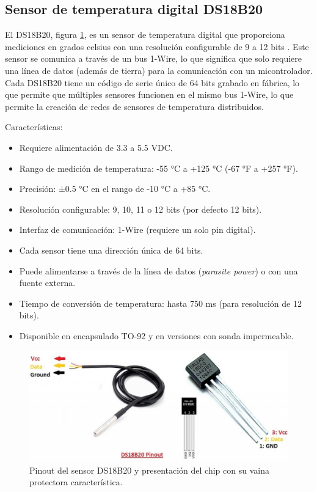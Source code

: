 \subsection{Sensor de temperatura digital DS18B20}

El DS18B20, figura \ref{fig:ds18b20}, es un sensor de temperatura digital que proporciona mediciones en grados celsius con una resolución configurable de 9 a 12 bits \cite{DS18B20}. Este sensor se comunica a través de un bus 1-Wire, lo que significa que solo requiere una línea de datos (además de tierra) para la comunicación con un micontrolador. Cada DS18B20 tiene un código de serie único de 64 bits grabado en fábrica, lo que permite que múltiples sensores funcionen en el mismo bus 1-Wire, lo que permite la creación de redes de sensores de temperatura distribuidos.

Características:

\begin{itemize}
	\item Requiere alimentación de 3.3 a 5.5 VDC.
	\item Rango de medición de temperatura: -55 °C a +125 °C (-67 °F a +257 °F).
	\item Precisión: ±0.5 °C en el rango de -10 °C a +85 °C.
	\item Resolución configurable: 9, 10, 11 o 12 bits (por defecto 12 bits).
	\item Interfaz de comunicación: 1-Wire (requiere un solo pin digital).
	\item Cada sensor tiene una dirección única de 64 bits.
	\item Puede alimentarse a través de la línea de datos (\textit{parasite power}) o con una fuente externa.
	\item Tiempo de conversión de temperatura: hasta 750 ms (para resolución de 12 bits).
	\item Disponible en encapsulado TO-92 y en versiones con sonda impermeable.
\end{itemize}


\begin{figure}[h]
\centering
\includegraphics[scale=.5]{./Figures/ds18b20.png}
	\caption{Pinout del sensor DS18B20 y presentación del chip con su vaina protectora característica\protect\footnotemark.}
	\label{fig:ds18b20}
\end{figure}

